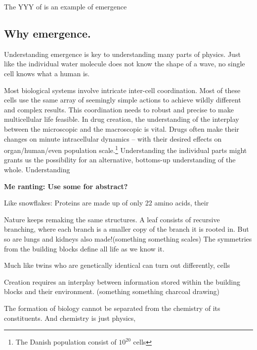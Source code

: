 The YYY of is an example of emergence
\subsection{Why emergence. }

Understanding emergence is key to understanding many parts of physics. Just like the individual water molecule does not know the shape of a wave, no single cell knows what a human is. 


Most biological systems involve intricate inter-cell coordination. Most of these cells use the same array of seemingly simple actions to achieve wildly different and complex results. This coordination needs to robust and precise to make multicellular life feasible. In drug creation, the understanding of the interplay between the microscopic and the macroscopic is vital. Drugs often make their changes on minute intracellular dynamics -- with their desired effects on organ/human/even population scale.\footnote{The Danish population consist of $10^{20}$ cells}
Understanding the individual parts might grants us the possibility for an alternative, bottoms-up understanding of the whole. Understanding  


\textbf{Me ranting: Use some for abstract?}

Like snowflakes:
Proteins are made up of only 22 amino acids, their 

Nature keeps remaking the same structures. A leaf consists of recursive branching, where each branch is a smaller copy of the branch it is rooted in. But so are lungs and kidneys also made!(something something scales)  The symmetries from the building blocks define all life as we know it. 

Much like twins who are genetically identical can turn out differently, cells

Creation requires an interplay between information stored within the building blocks and their environment. (something something charcoal drawing)

The formation of biology cannot be separated from the chemistry of its constituents. And chemistry is just physics, 

